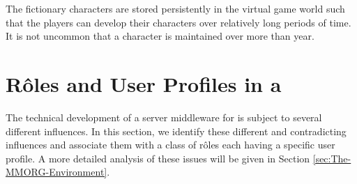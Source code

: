 \documentclass[a4paper, 10pt]{book}
\begin{document}
The fictionary characters are stored persistently in the virtual game world such
that the players can develop their characters over relatively long
periods of time. It is not uncommon that a character is maintained
over more than year.



\section{R\^{o}les and User Profiles in a \MMORG}

The technical development of a server middleware for \MMORGS is subject
to several different influences. In this section, we identify these 
different and contradicting influences and associate them with 
a class of r\^{o}les each having a specific user profile.
%
A more detailed analysis of these issues will be given in Section
\vref{sec:The-MMORG-Environment}.
%
\end{document}
